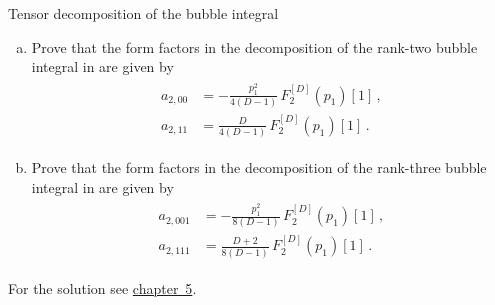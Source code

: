 \begin{exer}{Tensor decomposition of the bubble integral}
\label{Ex:3.3}
\vspace{-0.6cm}
\begin{enumerate}[a)]
\item Prove that the form factors in the decomposition of the rank-two bubble integral in  are given by
\begin{align} \label{eq:rank2bubsol}
\begin{aligned}
  a_{2,00} &= -\frac{p_1^2}{4(D-1)} \, F_2^{[D]}(p_1)[1] \,, \\
  a_{2,11} &= \frac{D}{4(D-1)} \, F_2^{[D]}(p_1)[1] \,.
\end{aligned}
\end{align}

\item Prove that the form factors in the decomposition of the rank-three bubble integral in  are given by
\begin{align} \label{eq:rank3bubsol}
\begin{aligned}
  a_{2,001} &= -\frac{p_1^2}{8(D-1)} \, F_2^{[D]}(p_1)[1] \,, \\
  a_{2,111} &= \frac{D+2}{8(D-1)} \, F_2^{[D]}(p_1)[1] \,.
\end{aligned}
\end{align}
\end{enumerate}
For the solution see \hyperref[Sol:3.3]{chapter~5}.
\end{exer}


